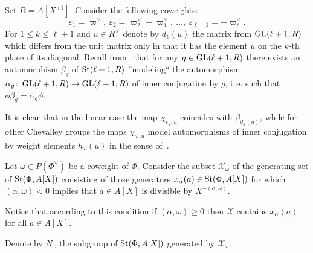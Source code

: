\begin{example} \label{exm:chi-linear}
Set $R = A[X^{\pm 1}]$.
Consider the following coweights:
\[\varepsilon_1 = \varpi_1^\vee,\ \varepsilon_2 = \varpi_2^\vee - \varpi_1^\vee,\ \ldots,\ \varepsilon_{\ell+1} = -\varpi^\vee_\ell.\]
For $1\leq k\leq \ell+1$ and $u \in R^\times$ denote by $d_k(u)$ the matrix from $\operatorname{GL}(\ell+1, R)$ which differs from the unit matrix only in that it has the element $u$ on the $k$-th place of its diagonal.
Recall from~\cite[Corollary~4]{Ka77} that for any $g \in \operatorname{GL}(\ell+1, R)$ there exists an automorphism $\beta_g$ of $\operatorname{St}(\ell+1, R)$ ''modeling`` the automorphism $\alpha_g \colon \operatorname{GL}(\ell+1, R) \to \operatorname{GL}(\ell+1, R)$ of inner conjugation by $g$, i.\,e. such that $\phi \beta_g = \alpha_g \phi$.


It is clear that in the linear case the map $\chi_{\varepsilon_k, u}$ coincides with $\beta_{d_k(u)}$,
 while for other Chevalley groups the maps $\chi_{\omega, u}$ model automorphisms of inner conjugation by weight elements $h_\omega(u)$ in the sense of~\cite[\S~4]{Vav09}.
\end{example}


Let $\omega \in P(\Phi^\vee)$ be a coweight of $\Phi$.
Consider the subset $\mathcal{X}_\omega$ of the generating set of $\operatorname{St}(\Phi, A[X])$ consisting of those generators $x_{\alpha}(a) \in \operatorname{St}(\Phi, A[X])$ for which
$(\alpha, \omega) < 0$ implies that $a \in A[X]$ is divisible by $X^{-(\alpha, \omega)}$.
\begin{rem}
Notice that according to this condition if $(\alpha, \omega) \geq 0$ then $\mathcal{X}$ contains $x_\alpha(a)$ for all $a \in A[X]$.
\end{rem}
Denote by $N_\omega$ the subgroup of $\operatorname{St}(\Phi, A[X])$ generated by $\mathcal{X}_\omega$.


